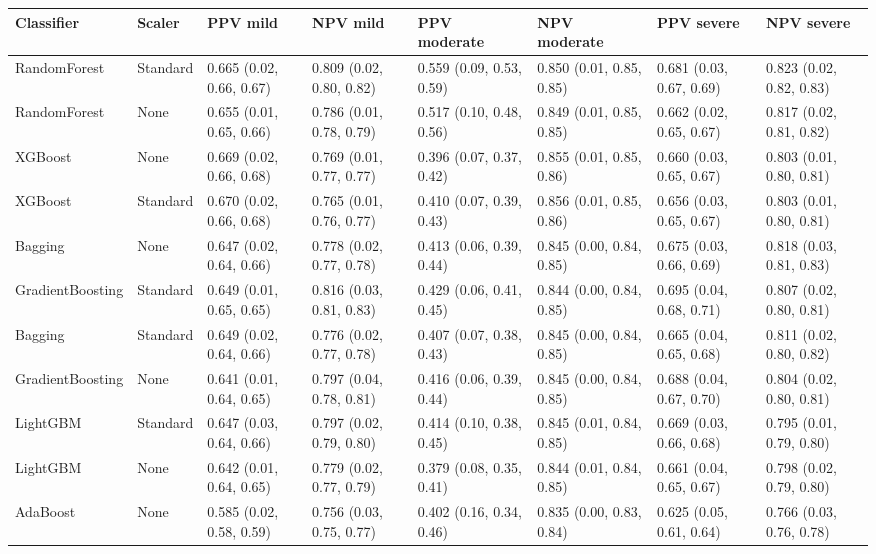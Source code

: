 \begin{tabular}{llllllll}
\toprule
Classifier & Scaler & PPV mild & NPV mild & PPV moderate & NPV moderate & PPV severe & NPV severe \\
\midrule
RandomForest & Standard & 0.665 (0.02, 0.66, 0.67) & 0.809 (0.02, 0.80, 0.82) & 0.559 (0.09, 0.53, 0.59) & 0.850 (0.01, 0.85, 0.85) & 0.681 (0.03, 0.67, 0.69) & 0.823 (0.02, 0.82, 0.83) \\
RandomForest & None & 0.655 (0.01, 0.65, 0.66) & 0.786 (0.01, 0.78, 0.79) & 0.517 (0.10, 0.48, 0.56) & 0.849 (0.01, 0.85, 0.85) & 0.662 (0.02, 0.65, 0.67) & 0.817 (0.02, 0.81, 0.82) \\
XGBoost & None & 0.669 (0.02, 0.66, 0.68) & 0.769 (0.01, 0.77, 0.77) & 0.396 (0.07, 0.37, 0.42) & 0.855 (0.01, 0.85, 0.86) & 0.660 (0.03, 0.65, 0.67) & 0.803 (0.01, 0.80, 0.81) \\
XGBoost & Standard & 0.670 (0.02, 0.66, 0.68) & 0.765 (0.01, 0.76, 0.77) & 0.410 (0.07, 0.39, 0.43) & 0.856 (0.01, 0.85, 0.86) & 0.656 (0.03, 0.65, 0.67) & 0.803 (0.01, 0.80, 0.81) \\
Bagging & None & 0.647 (0.02, 0.64, 0.66) & 0.778 (0.02, 0.77, 0.78) & 0.413 (0.06, 0.39, 0.44) & 0.845 (0.00, 0.84, 0.85) & 0.675 (0.03, 0.66, 0.69) & 0.818 (0.03, 0.81, 0.83) \\
GradientBoosting & Standard & 0.649 (0.01, 0.65, 0.65) & 0.816 (0.03, 0.81, 0.83) & 0.429 (0.06, 0.41, 0.45) & 0.844 (0.00, 0.84, 0.85) & 0.695 (0.04, 0.68, 0.71) & 0.807 (0.02, 0.80, 0.81) \\
Bagging & Standard & 0.649 (0.02, 0.64, 0.66) & 0.776 (0.02, 0.77, 0.78) & 0.407 (0.07, 0.38, 0.43) & 0.845 (0.00, 0.84, 0.85) & 0.665 (0.04, 0.65, 0.68) & 0.811 (0.02, 0.80, 0.82) \\
GradientBoosting & None & 0.641 (0.01, 0.64, 0.65) & 0.797 (0.04, 0.78, 0.81) & 0.416 (0.06, 0.39, 0.44) & 0.845 (0.00, 0.84, 0.85) & 0.688 (0.04, 0.67, 0.70) & 0.804 (0.02, 0.80, 0.81) \\
LightGBM & Standard & 0.647 (0.03, 0.64, 0.66) & 0.797 (0.02, 0.79, 0.80) & 0.414 (0.10, 0.38, 0.45) & 0.845 (0.01, 0.84, 0.85) & 0.669 (0.03, 0.66, 0.68) & 0.795 (0.01, 0.79, 0.80) \\
LightGBM & None & 0.642 (0.01, 0.64, 0.65) & 0.779 (0.02, 0.77, 0.79) & 0.379 (0.08, 0.35, 0.41) & 0.844 (0.01, 0.84, 0.85) & 0.661 (0.04, 0.65, 0.67) & 0.798 (0.02, 0.79, 0.80) \\
AdaBoost & None & 0.585 (0.02, 0.58, 0.59) & 0.756 (0.03, 0.75, 0.77) & 0.402 (0.16, 0.34, 0.46) & 0.835 (0.00, 0.83, 0.84) & 0.625 (0.05, 0.61, 0.64) & 0.766 (0.03, 0.76, 0.78) \\

\end{tabular}
